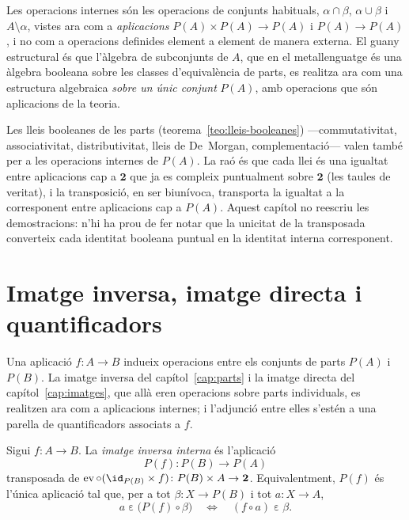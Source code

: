 \begin{observacio}\label{obs:booleanes-internes-classica}
Les operacions internes són les operacions de conjunts habituals,
\(\alpha\cap\beta\), \(\alpha\cup\beta\) i \(A\setminus\alpha\), vistes ara
com a \emph{aplicacions} \(P(A)\times P(A)\to P(A)\) i \(P(A)\to P(A)\), i
no com a operacions definides element a element de manera externa. El
guany estructural és que l'àlgebra de subconjunts de \(A\), que en el
metallenguatge és una àlgebra booleana sobre les classes d'equivalència de
parts, es realitza ara com una estructura algebraica \emph{sobre un únic
conjunt} \(P(A)\), amb operacions que són aplicacions de la teoria.
\end{observacio}

\begin{observacio}\label{obs:lleis-transportades}
Les lleis booleanes de les parts (teorema~\ref{teo:lleis-booleanes})
---commutativitat, associativitat, distributivitat, lleis de De~Morgan,
complementació--- valen també per a les operacions internes de
\(P(A)\). La raó és que cada llei és una igualtat entre aplicacions cap a
\(\mathbf2\) que ja es compleix puntualment sobre \(\mathbf2\)
(les taules de veritat), i la transposició, en ser biunívoca, transporta
la igualtat a la corresponent entre aplicacions cap a \(P(A)\). Aquest
capítol no reescriu les demostracions: n'hi ha prou de fer notar que la
unicitat de la transposada converteix cada identitat booleana puntual en
la identitat interna corresponent.
\end{observacio}

\section{Imatge inversa, imatge directa i quantificadors}\label{sec:quantificadors}

Una aplicació \(f\colon A\to B\) indueix operacions entre els conjunts de
parts \(P(A)\) i \(P(B)\). La imatge inversa del capítol~\ref{cap:parts} i
la imatge directa del capítol~\ref{cap:imatges}, que allà eren operacions
sobre parts individuals, es realitzen ara com a aplicacions internes; i
l'adjunció entre elles s'estén a una parella de quantificadors associats
a \(f\).

\begin{definicio}\label{def:imatge-inversa-interna}
Sigui \(f\colon A\to B\). La \emph{imatge inversa interna} és l'aplicació
\[
P(f)\colon P(B)\to P(A)
\]
transposada de
\(\operatorname{ev}\circ(\id_{P(B)}\times f)\colon P(B)\times A\to\mathbf2\).
Equivalentment, \(P(f)\) és l'única aplicació tal que, per a tot
\(\beta\colon X\to P(B)\) i tot \(a\colon X\to A\),
\[
a\mathrel{\varepsilon}\bigl(P(f)\circ\beta\bigr)
\quad\Longleftrightarrow\quad
(f\circ a)\mathrel{\varepsilon}\beta .
\]
\end{definicio}

